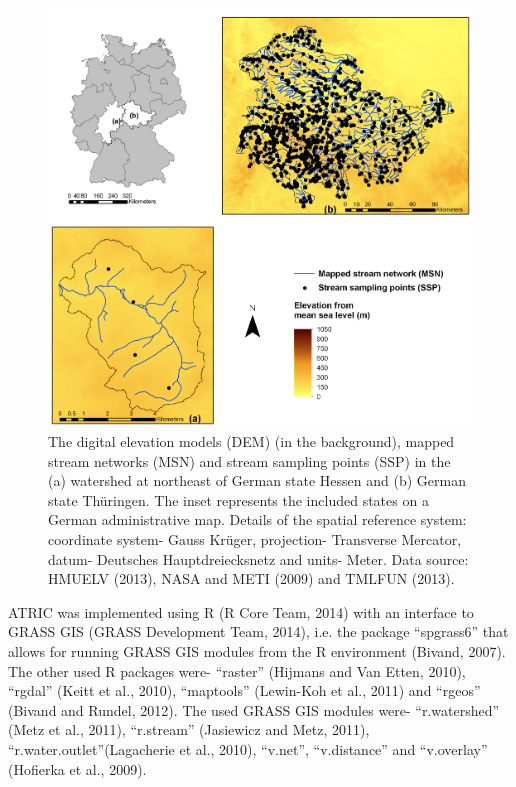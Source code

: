 \noindent\begin{figure}[h!]
  \centering
  \includegraphics[width=\textwidth]{Figures/Fig_2_1.png}
  \caption{The digital elevation models (DEM) (in the background), mapped stream networks (MSN) and stream sampling points (SSP) in the (a)  watershed at  northeast of German state Hessen and (b) German state Thüringen. The inset represents the included states on a German administrative map. Details of the spatial reference system: coordinate system- Gauss Krüger, projection- Transverse Mercator, datum- Deutsches Hauptdreiecksnetz and units- Meter. Data source: HMUELV (2013), NASA and METI (2009) and TMLFUN (2013).}
  \label{Fig_2_1}
\end{figure}

ATRIC was implemented using R (R Core Team, 2014) with an interface to GRASS GIS (GRASS Development Team, 2014), i.e. the package “spgrass6” that allows for running GRASS GIS modules from the R environment (Bivand, 2007). The other used R packages were- “raster” (Hijmans and Van Etten, 2010), “rgdal” (Keitt et al., 2010), “maptools” (Lewin-Koh et al., 2011) and “rgeos” (Bivand and Rundel, 2012). The used GRASS GIS modules were- “r.watershed” (Metz et al., 2011), “r.stream” (Jasiewicz and Metz, 2011), “r.water.outlet”(Lagacherie et al., 2010), “v.net”, “v.distance” and “v.overlay” (Hofierka et al., 2009).

